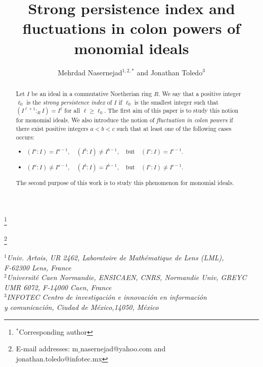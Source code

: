 \documentclass[11pt]{amsart}
\begin{document}
\author[M. Nasernejad   and   J. Toledo]{Mehrdad  Nasernejad$^{1,2,*}$ and   Jonathan Toledo$^{3}$}
\title[Strong persistence index and fluctuations in colon powers]{Strong persistence index and fluctuations in colon powers of monomial ideals}


\thanks{$^*$Corresponding author}



\thanks{E-mail addresses:  m$\_$nasernejad@yahoo.com  and  jonathan.toledo@infotec.mx}  
\maketitle

\begin{center}
{\it
$^{1}$Univ. Artois, UR 2462, Laboratoire de Math\'{e}matique de  Lens (LML), \\  F-62300 Lens, France \\ 
$^{2}$Universit\'e  Caen Normandie, ENSICAEN, CNRS, Normandie Univ, GREYC UMR  6072, F-14000 Caen,  France\\
$^{3}$INFOTEC Centro de investigaci\'{o}n e innovaci\'{o}n en informaci\'{o}n \\
 y comunicaci\'{o}n, Ciudad de M\'{e}xico,14050, M\'{e}xico
}
\end{center}

\vspace{0.4cm}
 
  

\begin{abstract}
Let $I$ be an ideal in  a commutative  Noetherian ring $R$. We say that a positive integer  $\ell_0$ is the \textit{strong persistence index} of $I$ if $\ell_0$ is the smallest integer such that $(I^{\ell+1}:_RI)=I^{\ell}$ for all  $\ell\geq \ell_0$. The first aim of this paper is to study this notion for monomial ideals. 
We also  introduce the notion of  \textit{fluctuation in colon powers}
 if there exist  positive integers $a<b<c$ such that at least one of the following cases occurs:
\begin{itemize}
\item[(i)]  $(I^{a}:I) = I^{a-1}, \quad (I^{b}:I) \neq I^{b-1}, \quad \text{but} \quad (I^{c}:I) = I^{c-1}.$
\item[(ii)] $(I^{a}:I) \neq I^{a-1}, \quad (I^{b}:I) = I^{b-1}, \quad \text{but} \quad (I^{c}:I) \neq I^{c-1}.$
\end{itemize}
The second purpose  of this work is to study  this phenomenon for monomial ideals.  
 \end{abstract}
\vspace{0.4cm}
\end{document}
